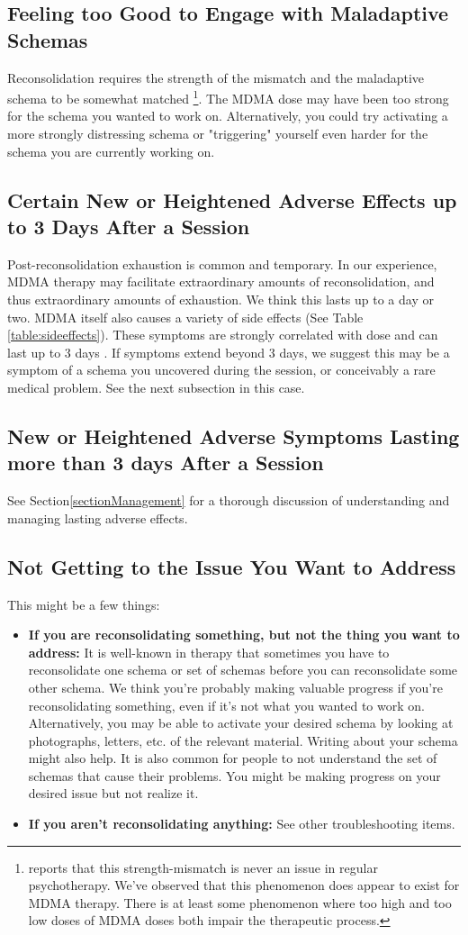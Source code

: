 \documentclass[12pt,letterpaper]{book}
\begin{document}
\subsection*{Feeling too Good to Engage with Maladaptive Schemas}
Reconsolidation requires the strength of the mismatch and the maladaptive schema to be somewhat matched \cite{eckerUnlocking} \footnote{\textcite{eckerUnlocking} reports that this strength-mismatch is never an issue in regular psychotherapy. We've observed that this phenomenon does appear to exist for MDMA therapy. There is at least some phenomenon where too high and too low doses of MDMA doses both impair the therapeutic process.}. The MDMA dose may have been too strong for the schema you wanted to work on. Alternatively, you could try activating a more strongly distressing schema or "triggering" yourself even harder for the schema you are currently working on.
\subsection*{Certain New or Heightened Adverse Effects up to 3 Days After a Session}
Post-reconsolidation exhaustion is common and temporary. In our experience, MDMA therapy may facilitate extraordinary amounts of reconsolidation, and thus extraordinary amounts of exhaustion. We think this lasts up to a day or two. MDMA itself also causes a variety of side effects (See Table \ref{table:sideeffects}). These symptoms are strongly correlated with dose and can last up to 3 days \cite{liechtiGender}. If symptoms extend beyond 3 days, we suggest this may be a symptom of a schema you uncovered during the session, or conceivably a rare medical problem. See the next subsection in this case.
\subsection*{New or Heightened Adverse Symptoms Lasting more than 3 days After a Session}
See Section\ref{sectionManagement} for a thorough discussion of understanding and managing lasting adverse effects.
\subsection*{Not Getting to the Issue You Want to Address}
This might be a few things:
\begin{itemize}
    \item \textbf{If you are reconsolidating something, but not the thing you want to address:} It is well-known in therapy that sometimes you have to reconsolidate one schema or set of schemas before you can reconsolidate some other schema. We think you're probably making valuable progress if you're reconsolidating something, even if it's not what you wanted to work on. Alternatively, you may be able to activate your desired schema by looking at photographs, letters, etc. of the relevant material. Writing about your schema might also help. It is also common for people to not understand the set of schemas that cause their problems. You might be making progress on your desired issue but not realize it.
    \item \textbf{If you aren't reconsolidating anything:} See other troubleshooting items.
\end{itemize}
\end{document}
